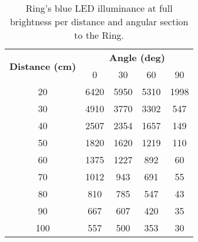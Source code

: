 \begin{table}[h!]
	\centering
	\caption{Ring's blue LED illuminance at full brightness per distance and angular section to the Ring.}
	\label{table:illuminance_blue}
	\begin{tabular}{ccccc}
		\hline
		\hline
		\toprule
		\multirow{2}{*}{\textbf{Distance (cm)}} & \multicolumn{4}{c}{\textbf{Angle (deg)}}\\
		& 0 & 30 & 60 & 90 \\
		\bottomrule
		\toprule
		20    &    6420    &    5950    &    5310    &    1998    \\
		30    &    4910    &    3770    &    3302    &    547        \\
		40    &    2507    &    2354    &    1657    &    149        \\
		50    &    1820    &    1620    &    1219    &    110        \\
		60    &    1375    &    1227    &    892        &    60        \\
		70    &    1012    &    943        &    691        &    55        \\
		80    &    810        &    785        &    547        &    43        \\
		90    &    667        &    607        &    420        &    35        \\
		100    &    557        &    500        &    353        &    30        \\
		\bottomrule
		\hline
		\hline
	\end{tabular}
\end{table}
